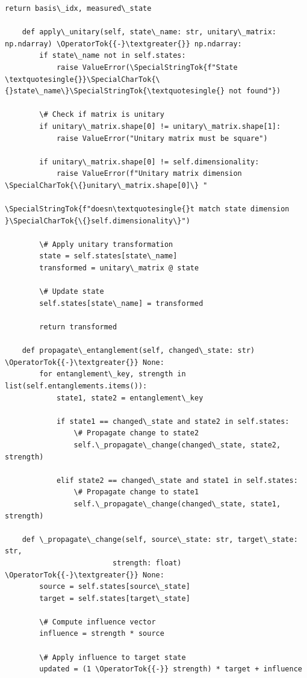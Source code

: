 \documentclass[12pt]{article}
\begin{document}
\begin{lstlisting}[basicstyle=\ttfamily\small]
        return basis\_idx, measured\_state
    
    def apply\_unitary(self, state\_name: str, unitary\_matrix: np.ndarray) \OperatorTok{{-}\textgreater{}} np.ndarray:
        if state\_name not in self.states:
            raise ValueError(\SpecialStringTok{f"State \textquotesingle{}}\SpecialCharTok{\{}state\_name\}\SpecialStringTok{\textquotesingle{} not found"})
        
        \# Check if matrix is unitary
        if unitary\_matrix.shape[0] != unitary\_matrix.shape[1]:
            raise ValueError("Unitary matrix must be square")
        
        if unitary\_matrix.shape[0] != self.dimensionality:
            raise ValueError(f"Unitary matrix dimension \SpecialCharTok{\{}unitary\_matrix.shape[0]\} "
                           \SpecialStringTok{f"doesn\textquotesingle{}t match state dimension }\SpecialCharTok{\{}self.dimensionality\}")
        
        \# Apply unitary transformation
        state = self.states[state\_name]
        transformed = unitary\_matrix @ state
        
        \# Update state
        self.states[state\_name] = transformed
        
        return transformed
    
    def propagate\_entanglement(self, changed\_state: str) \OperatorTok{{-}\textgreater{}} None:
        for entanglement\_key, strength in list(self.entanglements.items()):
            state1, state2 = entanglement\_key
            
            if state1 == changed\_state and state2 in self.states:
                \# Propagate change to state2
                self.\_propagate\_change(changed\_state, state2, strength)
            
            elif state2 == changed\_state and state1 in self.states:
                \# Propagate change to state1
                self.\_propagate\_change(changed\_state, state1, strength)
    
    def \_propagate\_change(self, source\_state: str, target\_state: str, 
                         strength: float) \OperatorTok{{-}\textgreater{}} None:
        source = self.states[source\_state]
        target = self.states[target\_state]
        
        \# Compute influence vector
        influence = strength * source
        
        \# Apply influence to target state
        updated = (1 \OperatorTok{{-}} strength) * target + influence
        

\end{lstlisting}
\end{document}
